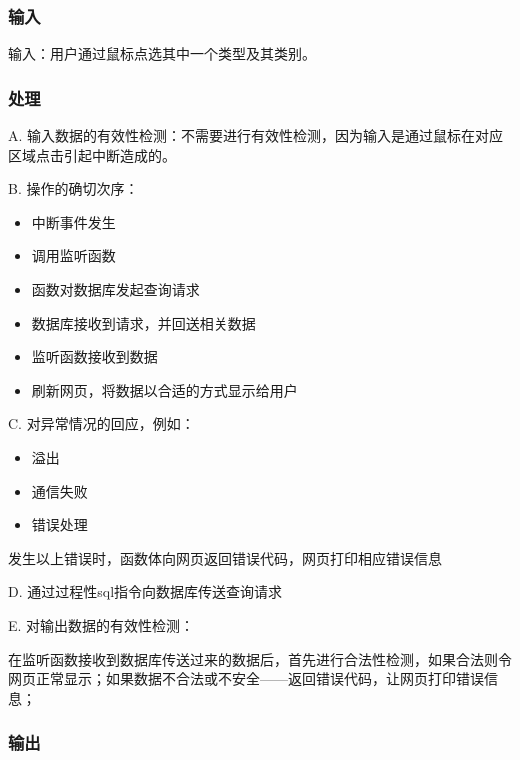 \subsubsection{输入}

输入：用户通过鼠标点选其中一个类型及其类别。


\subsubsection{处理}



A. 输入数据的有效性检测：不需要进行有效性检测，因为输入是通过鼠标在对应区域点击引起中断造成的。

B. 操作的确切次序：
\begin{adjustwidth}{2cm}{1cm}\qquad
	\begin{itemize}
		\item 中断事件发生
		\item 调用监听函数
		\item 函数对数据库发起查询请求
		\item 数据库接收到请求，并回送相关数据
		\item 监听函数接收到数据
		\item 刷新网页，将数据以合适的方式显示给用户
	\end{itemize}		
\end{adjustwidth}
 

C. 对异常情况的回应，例如：
\begin{adjustwidth}{2cm}{1cm}\qquad
	\begin{itemize}
		\item 溢出
		\item 通信失败
		\item 错误处理
	\end{itemize}		
\end{adjustwidth}

	发生以上错误时，函数体向网页返回错误代码，网页打印相应错误信息

D. 通过过程性sql指令向数据库传送查询请求
		
E. 对输出数据的有效性检测：

在监听函数接收到数据库传送过来的数据后，首先进行合法性检测，如果合法则令网页正常显示；如果数据不合法或不安全——返回错误代码，让网页打印错误信息；

\subsubsection{输出}

